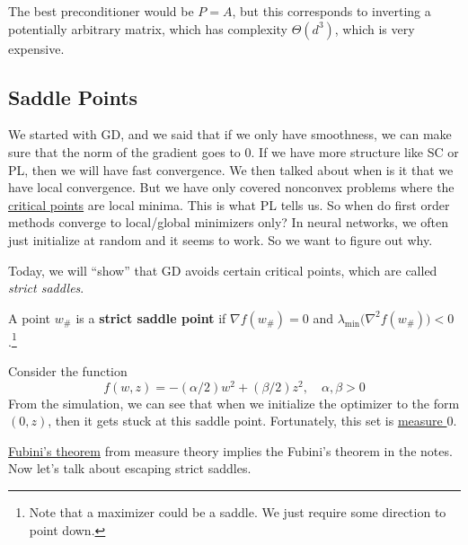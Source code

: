 	The best preconditioner would be $P = A$, but this corresponds to inverting a potentially arbitrary matrix, which has complexity $\Theta(d^3)$, which is very expensive. 
	
\subsection{Saddle Points} 

	We started with GD, and we said that if we only have smoothness, we can make sure that the norm of the gradient goes to $0$. If we have more structure like SC or PL, then we will have fast convergence. We then talked about when is it that we have local convergence. But we have only covered nonconvex problems where the \hyperref[real-def:critical-point]{critical points} are local minima. This is what PL tells us. So when do first order methods converge to local/global minimizers only? In neural networks, we often just initialize at random and it seems to work. So we want to figure out why. 

	Today, we will ``show'' that GD avoids certain critical points, which are called \textit{strict saddles}. 

	\begin{definition}
	  \label{def:strict-saddle}
		A point $w_{\#}$ is a \textbf{strict saddle point} if $\nabla f(w_{\#}) = 0$ and $\lambda_{\min}\big(\nabla^2 f(w_{\#})\big) < 0$.\footnote{Note that a maximizer could be a saddle. We just require some direction to point down.} 
	\end{definition}
	
	\begin{example}[]
	  \label{ex:function-simulation-see-when-initialize}
	  Consider the function 
		\begin{equation}
		  f(w, z) = -(\alpha/2) w^2 + (\beta/2)z^2, \quad \alpha, \beta > 0
		\end{equation}
		From the simulation, we can see that when we initialize the optimizer to the form $(0, z)$, then it gets stuck at this saddle point. Fortunately, this set is \hyperref[mt-def:almost_everywhere]{measure $0$}. 
	\end{example}

	\hyperref[mt-thm:fubinis-theorem]{Fubini's theorem} from measure theory implies the Fubini's theorem in the notes. Now let's talk about escaping strict saddles. 

